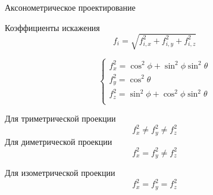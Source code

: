 \documentclass{beamer}
\begin{document}
	\begin{frame}{Аксонометрическое проектирование}

		Коэффициенты искажения
		\[
			f_i = \sqrt{f_{i,x}^2+f_{i,y}^2+f_{i,z}^2}
		\]

		\[
		\begin{cases}
			f_x^2 = \cos^2 \phi + \sin^2 \phi \sin^2 \theta \\
			f_y^2 = \cos^2 \theta \\
			f_z^2 = \sin^2 \phi + \cos^2 \phi \sin^2 \theta \\
		\end{cases}	
		\]

		Для триметрической проекции
		\[
			f_x^2 \neq f_y^2 \neq f_z^2
		\]
		Для диметрической проекции
		\[
			f_x^2 = f_y^2 \neq f_z^2
		\]

		Для изометрической проекции
		\[
			f_x^2 = f_y^2 = f_z^2
		\]
		
		
	\end{frame}
\end{document}
